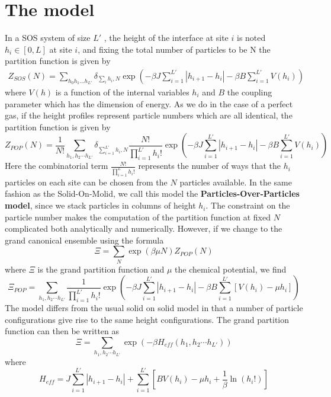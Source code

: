 \section{The model}

In a SOS system of size $L'$ , the height of the interface at site $i$ is noted $h_i \in [0,L]$ at site $i$, and fixing the total number of particles to be N the partition function is given by
\begin{align}
Z_{SOS}(N) = \sum_{h_0 h_1 ... h_{L'}} \delta_{\sum_i h_i, N} \exp\left(-\beta J \sum_{i=1}^{L'} |h_{i+1}-h_i| -\beta B\sum_{i=1}^{L'} V(h_i)\right)
\end{align}
where $V(h)$ is a function of the internal variables $h_i$ and $B$ the coupling parameter which has the dimension of energy. As we do in the case of a perfect gas, if the height profiles represent particle numbers which are all identical, the partition function is given by
\begin{equation}
Z_{POP}(N) = \frac{1}{N!}\sum_{h_1,h_2\cdots h_{L'}} \delta_{\sum_{i=1}^{L'} h_i, N}\frac{N!}{\prod_{i=1}^{L'} h_i!} \exp\left(-\beta J \sum_{i=1}^{L'} |h_{i+1}-h_i| -\beta B \sum_{i=1}^{L'} V(h_i)\right)
\end{equation}
Here the combinatorial term $\frac{N!}{\prod_{i=1}^L h_i!}$ represents the number of ways that the $h_i$ particles on each site can be chosen from the $N$ particles available. In the same fashion as the Solid-On-Molid, we call this model the \textbf{Particles-Over-Particles model}, since we stack particles in columns of height $h_i$. The constraint on the particle number makes the computation of the partition function at fixed $N$ complicated both analytically and numerically. However, if we change to the grand canonical ensemble using
the formula
\begin{equation}
\Xi = \sum_{N} \exp(\beta\mu N) Z_{POP}(N)
\end{equation}
where $\Xi$ is the grand partition function and $\mu$ the chemical potential, we find
\begin{equation}
\Xi_{POP} = \sum_{h_1,h_2\cdots h_{L'}} \frac{1}{\prod_{i=1}^{L'} h_i!} \exp\left(-\beta J \sum_{i=1}^{L'} |h_{i+1}-h_i| -\beta B \sum_{i=1}^{L'}[ V(h_i)-\mu h_i]\right)
\end{equation}
The model differs from the usual solid on solid model in that a number of particle configurations give rise to the same height configurations. The grand partition function can then be written as 
\begin{equation}
\Xi = \sum_{h_1,h_2\cdots h_{L'}} \exp\left(-\beta H_{eff}(h_1,h_2\cdots h_{L'})\right)
\end{equation}
where 
\begin{equation}
H_{eff}= J \sum_{i=1}^{L'} |h_{i+1}-h_i| +\sum_{i=1}^{L'} [B V(h_i)-\mu h_i +\frac{1}{\beta}\ln(h_i !)]
\label{heff-pop}
\end{equation}

